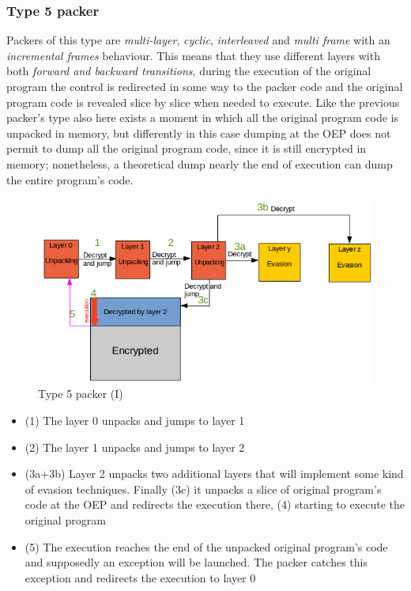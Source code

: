 \subsubsection{Type 5 packer}
Packers of this type are \textit{multi-layer}, \textit{cyclic}, \textit{interleaved} and \textit{multi frame} with an \textit{incremental frames} behaviour. This means that they use different layers with both \textit{forward and backward transitions}, during the execution of the original program the control is redirected in some way to the packer code and the original program code is revealed slice by slice when needed to execute. Like the previous packer's type also here exists a moment in which all the original program code is unpacked in memory, but differently in this case dumping at the \ac{OEP} does not permit to dump all the original program code, since it is still encrypted in memory; nonetheless, a theoretical dump nearly the end of execution can dump the entire program's code.
\begin{figure}[!ht]
	\begin{center}
   		\includegraphics[width=\textwidth]{pictures/packer_type_5-1.png}
	\end{center}
	\caption{Type 5 packer (I)}
\end{figure}
\begin{itemize}
\item (1) The layer 0 unpacks and jumps to layer 1
\item (2) The layer 1 unpacks and jumps to layer 2
\item (3a+3b) Layer 2 unpacks two additional layers that will implement some kind of evasion techniques. Finally (3c) it unpacks a slice of original program's code at the \ac{OEP} and redirects the execution there, (4) starting to execute the original program
\item (5) The execution reaches the end of the unpacked original program's code and supposedly an exception will be launched. The packer catches this exception and redirects the execution to layer 0
\end{itemize}
